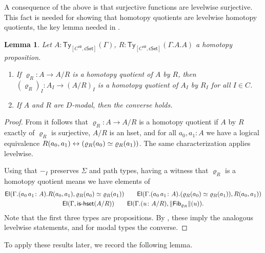 \documentclass[10pt,a4paper]{article}
\newtheorem{lemma}[theorem]{Lemma}
\theoremstyle{definition}
\theoremstyle{remark}
\newcommand{\cSet}{\mathsf{cSet}}
\DeclareMathOperator\op{\mathsf{op}}
\newcommand\Ty{\mathsf{Ty}}
\newcommand\El{\mathsf{El}}
\DeclarePairedDelimiter\paren{(}{)}
\newcommand\Fib{\mathsf{Fib}}
\begin{document}
A consequence of the above is that surjective functions are levelwise surjective.
This fact is needed for showing that homotopy quotients are levelwise homotopy quotients, the key lemma needed in .

\begin{lemma}\label{prop:psh:levelwise-quotient-if-homotopy-quotient}
  Let \(A \colon \Ty_{[C^{\op}, \cSet]}(\Gamma)\), \(R \colon \Ty_{[C^{\op}, \cSet]}(\Gamma.A.A)\) a homotopy proposition.
  \begin{enumerate}[label=(\arabic*)]
    \item If \(\varrho_R \colon A \to A/R\) is a homotopy quotient of \(A\) by \(R\), then \((\varrho_R)_I \colon A_I \to (A/R)_I\) is a homotopy quotient of \(A_I\) by \(R_I\) for all \(I \in C\).
    \item\label{prop:psh:levelwise-quotient-if-homotopy-quotient:modal-converse} If \(A\) and \(R\) are \(D\)-modal, then the converse holds.
  \end{enumerate}
\end{lemma}
\begin{proof}
  From \cite[Theorem 18.2.3]{rijke2025intro} it follows that \(\varrho_R \colon A \to A/R\) is a homotopy quotient if \(A\) by \(R\) exactly of \(\varrho_R\) is surjective, \(A/R\) is an hset, and for all \(a_0, a_1 \colon A\) we have a logical equivalence \(R(a_0, a_1) \leftrightarrow \paren{\varrho_R(a_0) \simeq \varrho_R(a_1)}\).
  The same characterization applies levelwise.

  Using that \(-_I\) preserves \(\Sigma\) and path types, having a witness that \(\varrho_R\) is a homotopy quotient means we have elements of
  \begin{gather*}  
    \El(\Gamma.(a_0\,a_1 \colon A).R(a_0, a_1), \varrho_R(a_0) \simeq \varrho_R(a_1))
    \qquad \El(\Gamma.(a_0\,a_1 \colon A).(\varrho_R(a_0) \simeq \varrho_R(a_1)), R(a_0, a_1)) \\
    \El(\Gamma, \textsf{is-hset}(A/R))
    \qquad
    \El(\Gamma.(u \colon A/R), \trunc{\Fib_{\varrho_R}}(u)).
  \end{gather*}
  Note that the first three types are propositions.
  By , these imply the analogous levelwise statements, and for modal types the converse.
\end{proof}
%
To apply these results later, we record the following lemma.
\end{document}
